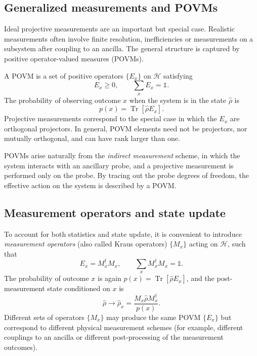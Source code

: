 \subsection{Generalized measurements and POVMs}
\label{sec:povm}

Ideal projective measurements are an important but special case. 
Realistic measurements often involve finite resolution, inefficiencies or measurements on a subsystem after coupling to an ancilla. 
The general structure is captured by positive operator-valued measures (POVMs).

A POVM is a set of positive operators $\{E_x\}$ on $\mathcal{H}$ satisfying
\begin{equation}
	E_x \geq 0,
	\qquad
	\sum_x E_x = \mathbb{1}.
\end{equation}
The probability of observing outcome $x$ when the system is in the state $\hat{\rho}$ is
\begin{equation}
	p(x) = \operatorname{Tr}[\hat{\rho} E_x].
\end{equation}
Projective measurements correspond to the special case in which the $E_x$ are orthogonal projectors. 
In general, POVM elements need not be projectors, nor mutually orthogonal, and can have rank larger than one.

POVMs arise naturally from the \emph{indirect measurement} scheme, in which the system interacts with an ancillary probe, and a projective measurement is performed only on the probe. 
By tracing out the probe degrees of freedom, the effective action on the system is described by a POVM.

\subsection{Measurement operators and state update}

To account for both statistics and state update, it is convenient to introduce \emph{measurement operators} (also called Kraus operators) $\{M_x\}$ acting on $\mathcal{H}$, such that
\begin{equation}
	E_x = M_x^\dagger M_x,
	\qquad
	\sum_x M_x^\dagger M_x = \mathbb{1}.
\end{equation}
The probability of outcome $x$ is again $p(x) = \operatorname{Tr}[\hat{\rho} E_x]$, and the post-measurement state conditioned on $x$ is
\begin{equation}
	\hat{\rho} \longrightarrow \hat{\rho}_x =
	\frac{M_x \hat{\rho} M_x^\dagger}{p(x)}.
\end{equation}
Different sets of operators $\{M_x\}$ may produce the same POVM $\{E_x\}$ but correspond to different physical measurement schemes (for example, different couplings to an ancilla or different post-processing of the measurement outcomes).

